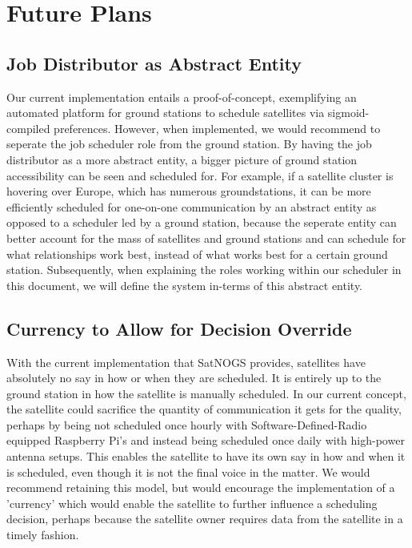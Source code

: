 \documentclass{article}
\begin{document}
\section{Future Plans}

\subsection{Job Distributor as Abstract Entity}
Our current implementation entails a proof-of-concept, exemplifying an automated platform for ground stations to schedule satellites via sigmoid-compiled preferences. However, when implemented, we would recommend to seperate the job scheduler role from the ground station. By having the job distributor as a more abstract entity, a bigger picture of ground station accessibility can be seen and scheduled for. For example, if a satellite cluster is hovering over Europe, which has numerous groundstations, it can be more efficiently scheduled for one-on-one communication by an abstract entity as opposed to a scheduler led by a ground station, because the seperate entity can better account for the mass of satellites and ground stations and can schedule for what relationships work best, instead of what works best for a certain ground station. Subsequently, when explaining the roles working within our scheduler in this document, we will define the system in-terms of this abstract entity.

\subsection{Currency to Allow for Decision Override}
With the current implementation that SatNOGS provides, satellites have absolutely no say in how or when they are scheduled. It is entirely up to the ground station in how the satellite is manually scheduled. In our current concept, the satellite could sacrifice the quantity of communication it gets for the quality, perhaps by being not scheduled once hourly with Software-Defined-Radio equipped Raspberry Pi's and instead being scheduled once daily with high-power antenna setups. This enables the satellite to have its own say in how and when it is scheduled, even though it is not the final voice in the matter. We would recommend retaining this model, but would encourage the implementation of a 'currency' which would enable the satellite to further influence a scheduling decision, perhaps because the satellite owner requires data from the satellite in a timely fashion.
\end{document}
